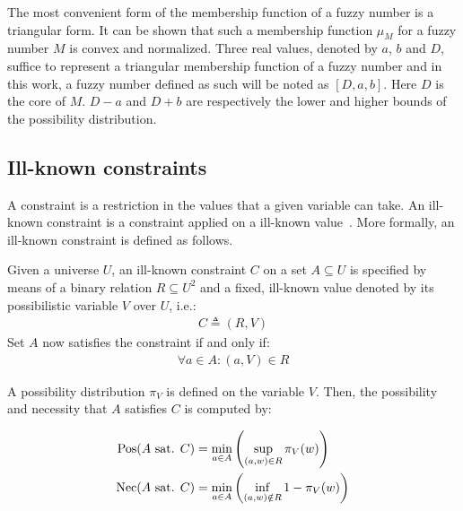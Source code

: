 The most convenient form of the membership function of a fuzzy number is a triangular form. It can be shown that such a membership function $\mu_M$ for a fuzzy number $M$ is convex and normalized. Three real values, denoted by $a$, $b$ and $D$, suffice to represent a triangular membership function of a fuzzy number and in this work, a fuzzy number defined as such will be noted as $\left[D, a, b \right]$. Here $D$ is the core of $M$. $D-a$ and $D+b$ are respectively the lower and higher bounds of the possibility distribution.



\subsection{\label{subsec:ikc-framework}Ill-known constraints}
A constraint is a restriction in the values that a given variable can take. An ill-known constraint is a constraint applied on a ill-known value~\cite{Pons2011}. More formally, an ill-known constraint is defined as follows.
\begin{definition}
Given a universe $U$, an ill-known constraint $C$ on a set $A \subseteq U$ is specified by means of a binary relation $R \subseteq U^{2}$ and a fixed, ill-known value denoted by its possibilistic variable $V$ over $U$, i.e.:
\begin{align}
C \triangleq (R,V)
\end{align}
Set $A$ now satisfies the constraint if and only if:
\begin{align}
\forall a \in A : (a,V) \in R
\end{align}
\end{definition}
A possibility distribution $\pi_{V}$ is defined on the variable $V$. Then, the  possibility and necessity that $A$ satisfies $C$ is computed by:

\begin{align}
\operatorname{Pos}(A\text{ sat. }C) & = \min_{a \in A}\left(\sup_{(a,w) \in R}\pi_{V}(w)\right) \label{ill-known-pos}\\
\operatorname{Nec}(A\text{ sat. }C) & = \min_{a \in A}\left(\inf_{(a,w) \notin R} 1-\pi_{V}(w)\right) \label{ill-known-nec}
\end{align}

